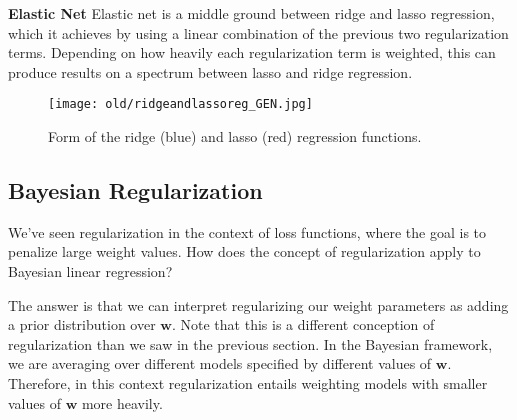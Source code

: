 \textbf{Elastic Net} \newline
Elastic net is a middle ground between ridge and lasso regression, which it achieves by using a linear combination of the previous two regularization terms. Depending on how heavily each regularization term is weighted, this can produce results on a spectrum between lasso and ridge regression. \\

\begin{figure}
    \centering
    \texttt{[image: old/ridgeandlassoreg\_GEN.jpg]}
    \caption{Form of the ridge (blue) and lasso (red) regression functions.}
    \label{fig:ridge-and-lasso-reg-fn-form}
\end{figure}


\subsection{Bayesian Regularization} \label{bayesian-regularization-section}
We've seen regularization in the context of loss functions, where the goal is to penalize large weight values. How does the concept of regularization apply to Bayesian linear regression?

The answer is that we can interpret regularizing our weight parameters as adding a prior distribution over $\mathbf{w}$. Note that this is a different conception of regularization than we saw in the previous section. In the Bayesian framework, we are averaging over different models specified by different values of $\mathbf{w}$. Therefore, in this context regularization entails weighting models with smaller values of $\mathbf{w}$ more heavily.

